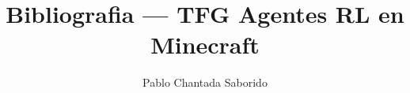%
%

\documentclass[11pt,a4paper]{article}
\usepackage[utf8]{inputenc}
\usepackage[T1]{fontenc}
\usepackage[spanish]{babel}
\usepackage{geometry}
\usepackage{hyperref}
\geometry{margin=2.5cm}

\title{Bibliografia --- TFG Agentes RL en Minecraft}
\author{Pablo Chantada Saborido}
\date{}


\maketitle

